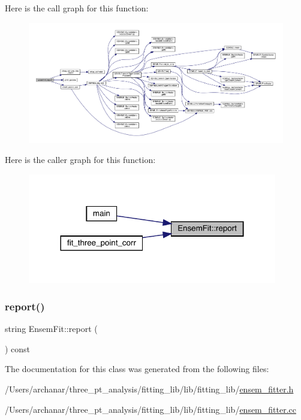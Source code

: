 Here is the call graph for this function\+:
\nopagebreak
\begin{figure}[H]
\begin{center}
\leavevmode
\includegraphics[width=350pt]{dc/dae/classEnsemFit_a699cb4ec2b3d2107c67aaed422414f4d_cgraph}
\end{center}
\end{figure}
Here is the caller graph for this function\+:
\nopagebreak
\begin{figure}[H]
\begin{center}
\leavevmode
\includegraphics[width=308pt]{dc/dae/classEnsemFit_a699cb4ec2b3d2107c67aaed422414f4d_icgraph}
\end{center}
\end{figure}
\mbox{\label{classEnsemFit_a699cb4ec2b3d2107c67aaed422414f4d}} 
\subsubsection{\texorpdfstring{report()}{report()}\hspace{0.1cm}{\footnotesize\ttfamily [2/2]}}
{\footnotesize\ttfamily string Ensem\+Fit\+::report (\begin{DoxyParamCaption}{ }\end{DoxyParamCaption}) const}



The documentation for this class was generated from the following files\+:\begin{DoxyCompactItemize}
\item 
/\+Users/archanar/three\+\_\+pt\+\_\+analysis/fitting\+\_\+lib/lib/fitting\+\_\+lib/\mbox{\hyperlink{lib_2fitting__lib_2ensem__fitter_8h}{ensem\+\_\+fitter.\+h}}\item 
/\+Users/archanar/three\+\_\+pt\+\_\+analysis/fitting\+\_\+lib/lib/fitting\+\_\+lib/\mbox{\hyperlink{ensem__fitter_8cc}{ensem\+\_\+fitter.\+cc}}\end{DoxyCompactItemize}
